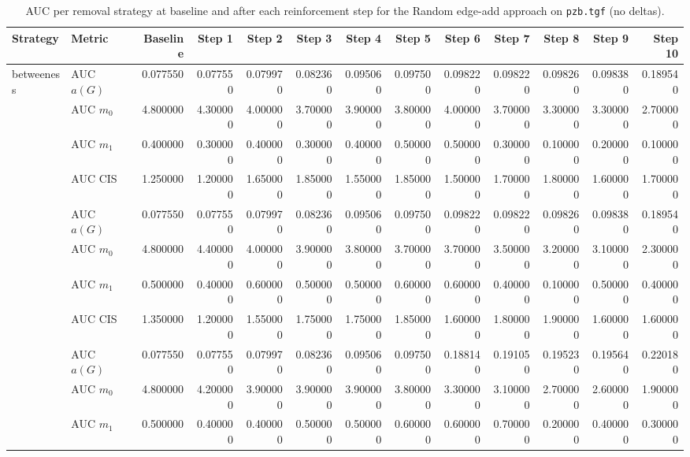 \begin{table}[htbp]
  \centering
  \caption{AUC per removal strategy at baseline and after each reinforcement step for the Random edge-add approach on \texttt{pzb.tgf} (no deltas).}
  \label{tab:pzb-random_add-auc}
\setlength{\tabcolsep}{2.5pt}
  \begin{tabular}{llrrrrrrrrrrr}
    \toprule
    \textbf{Strategy} & \textbf{Metric} & \textbf{Baseline} & \textbf{Step 1} & \textbf{Step 2} & \textbf{Step 3} & \textbf{Step 4} & \textbf{Step 5} & \textbf{Step 6} & \textbf{Step 7} & \textbf{Step 8} & \textbf{Step 9} & \textbf{Step 10} \\
    \midrule
    \multirow{4}{*}{betweeness} & AUC $a(G)$ & 0.077550 & 0.077550 & 0.079970 & 0.082360 & 0.095060 & 0.097500 & 0.098220 & 0.098220 & 0.098260 & 0.098380 & 0.189540 \\
    & AUC $m_0$ & 4.800000 & 4.300000 & 4.000000 & 3.700000 & 3.900000 & 3.800000 & 4.000000 & 3.700000 & 3.300000 & 3.300000 & 2.700000 \\
    & AUC $m_1$ & 0.400000 & 0.300000 & 0.400000 & 0.300000 & 0.400000 & 0.500000 & 0.500000 & 0.300000 & 0.100000 & 0.200000 & 0.100000 \\
    & AUC CIS & 1.250000 & 1.200000 & 1.650000 & 1.850000 & 1.550000 & 1.850000 & 1.500000 & 1.700000 & 1.800000 & 1.600000 & 1.700000 \\
    \addlinespace
    \multirow{4}{*}{closeness} & AUC $a(G)$ & 0.077550 & 0.077550 & 0.079970 & 0.082360 & 0.095060 & 0.097500 & 0.098220 & 0.098220 & 0.098260 & 0.098380 & 0.189540 \\
    & AUC $m_0$ & 4.800000 & 4.400000 & 4.000000 & 3.900000 & 3.800000 & 3.700000 & 3.700000 & 3.500000 & 3.200000 & 3.100000 & 2.300000 \\
    & AUC $m_1$ & 0.500000 & 0.400000 & 0.600000 & 0.500000 & 0.500000 & 0.600000 & 0.600000 & 0.400000 & 0.100000 & 0.500000 & 0.400000 \\
    & AUC CIS & 1.350000 & 1.200000 & 1.550000 & 1.750000 & 1.750000 & 1.850000 & 1.600000 & 1.800000 & 1.900000 & 1.600000 & 1.600000 \\
    \addlinespace
    \multirow{4}{*}{core influence} & AUC $a(G)$ & 0.077550 & 0.077550 & 0.079970 & 0.082360 & 0.095060 & 0.097500 & 0.188140 & 0.191050 & 0.195230 & 0.195640 & 0.220180 \\
    & AUC $m_0$ & 4.800000 & 4.200000 & 3.900000 & 3.900000 & 3.900000 & 3.800000 & 3.300000 & 3.100000 & 2.700000 & 2.600000 & 1.900000 \\
    & AUC $m_1$ & 0.500000 & 0.400000 & 0.400000 & 0.500000 & 0.500000 & 0.600000 & 0.600000 & 0.700000 & 0.200000 & 0.400000 & 0.300000 \\

\end{tabular}
\end{table}
